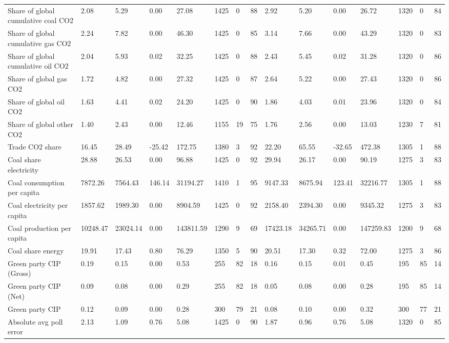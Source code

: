 \begin{longtable}{lllllllllllllll}
Share of global cumulative coal CO2 & 2.08 & 5.29 & 0.00 & 27.08 & 1425 & 0 & 88 & 2.92 & 5.20 & 0.00 & 26.72 & 1320 & 0 & 84\\
Share of global cumulative gas CO2 & 2.24 & 7.82 & 0.00 & 46.30 & 1425 & 0 & 85 & 3.14 & 7.66 & 0.00 & 43.29 & 1320 & 0 & 83\\
\addlinespace
Share of global cumulative oil CO2 & 2.04 & 5.93 & 0.02 & 32.25 & 1425 & 0 & 88 & 2.43 & 5.45 & 0.02 & 31.28 & 1320 & 0 & 86\\
Share of global gas CO2 & 1.72 & 4.82 & 0.00 & 27.32 & 1425 & 0 & 87 & 2.64 & 5.22 & 0.00 & 27.43 & 1320 & 0 & 86\\
Share of global oil CO2 & 1.63 & 4.41 & 0.02 & 24.20 & 1425 & 0 & 90 & 1.86 & 4.03 & 0.01 & 23.96 & 1320 & 0 & 84\\
Share of global other CO2 & 1.40 & 2.43 & 0.00 & 12.46 & 1155 & 19 & 75 & 1.76 & 2.56 & 0.00 & 13.03 & 1230 & 7 & 81\\
Trade CO2 share & 16.45 & 28.49 & -25.42 & 172.75 & 1380 & 3 & 92 & 22.20 & 65.55 & -32.65 & 472.38 & 1305 & 1 & 88\\
\addlinespace
Coal share electricity & 28.88 & 26.53 & 0.00 & 96.88 & 1425 & 0 & 92 & 29.94 & 26.17 & 0.00 & 90.19 & 1275 & 3 & 83\\
Coal consumption per capita & 7872.26 & 7564.43 & 146.14 & 31194.27 & 1410 & 1 & 95 & 9147.33 & 8675.94 & 123.41 & 32216.77 & 1305 & 1 & 88\\
Coal electricity per capita & 1857.62 & 1989.30 & 0.00 & 8904.59 & 1425 & 0 & 92 & 2158.40 & 2394.30 & 0.00 & 9345.32 & 1275 & 3 & 83\\
Coal production per capita & 10248.47 & 23024.14 & 0.00 & 143811.59 & 1290 & 9 & 69 & 17423.18 & 34265.71 & 0.00 & 147259.83 & 1200 & 9 & 68\\
Coal share energy & 19.91 & 17.43 & 0.80 & 76.29 & 1350 & 5 & 90 & 20.51 & 17.30 & 0.32 & 72.00 & 1275 & 3 & 86\\
\addlinespace
Green party CIP (Gross) & 0.19 & 0.15 & 0.00 & 0.53 & 255 & 82 & 18 & 0.16 & 0.15 & 0.01 & 0.45 & 195 & 85 & 14\\
Green party CIP (Net) & 0.09 & 0.08 & 0.00 & 0.29 & 255 & 82 & 18 & 0.05 & 0.08 & 0.00 & 0.28 & 195 & 85 & 14\\
Green party CIP & 0.12 & 0.09 & 0.00 & 0.28 & 300 & 79 & 21 & 0.08 & 0.10 & 0.00 & 0.32 & 300 & 77 & 21\\
Absolute avg poll error & 2.13 & 1.09 & 0.76 & 5.08 & 1425 & 0 & 90 & 1.87 & 0.96 & 0.76 & 5.08 & 1320 & 0 & 85\\

\end{longtable}
